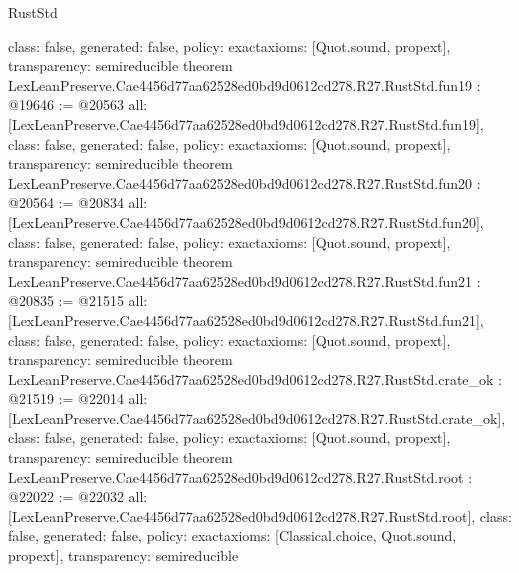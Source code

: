 \begin{lexlean}{RustStd}
\begin{coremodule}
{  class: false,
  generated: false,
  policy: exact{axioms: [Quot.sound, propext]},
  transparency: semireducible
}
theorem LexLeanPreserve.Cae4456d77aa62528ed0bd9d0612cd278.R27.RustStd.fun19 : @19646 := @20563 {
  all: [LexLeanPreserve.Cae4456d77aa62528ed0bd9d0612cd278.R27.RustStd.fun19],
  class: false,
  generated: false,
  policy: exact{axioms: [Quot.sound, propext]},
  transparency: semireducible
}
theorem LexLeanPreserve.Cae4456d77aa62528ed0bd9d0612cd278.R27.RustStd.fun20 : @20564 := @20834 {
  all: [LexLeanPreserve.Cae4456d77aa62528ed0bd9d0612cd278.R27.RustStd.fun20],
  class: false,
  generated: false,
  policy: exact{axioms: [Quot.sound, propext]},
  transparency: semireducible
}
theorem LexLeanPreserve.Cae4456d77aa62528ed0bd9d0612cd278.R27.RustStd.fun21 : @20835 := @21515 {
  all: [LexLeanPreserve.Cae4456d77aa62528ed0bd9d0612cd278.R27.RustStd.fun21],
  class: false,
  generated: false,
  policy: exact{axioms: [Quot.sound, propext]},
  transparency: semireducible
}
theorem LexLeanPreserve.Cae4456d77aa62528ed0bd9d0612cd278.R27.RustStd.crate_ok : @21519 := @22014 {
  all: [LexLeanPreserve.Cae4456d77aa62528ed0bd9d0612cd278.R27.RustStd.crate_ok],
  class: false,
  generated: false,
  policy: exact{axioms: [Quot.sound, propext]},
  transparency: semireducible
}
theorem LexLeanPreserve.Cae4456d77aa62528ed0bd9d0612cd278.R27.RustStd.root : @22022 := @22032 {
  all: [LexLeanPreserve.Cae4456d77aa62528ed0bd9d0612cd278.R27.RustStd.root],
  class: false,
  generated: false,
  policy: exact{axioms: [Classical.choice, Quot.sound, propext]},
  transparency: semireducible
}


\end{coremodule}
\end{lexlean}

